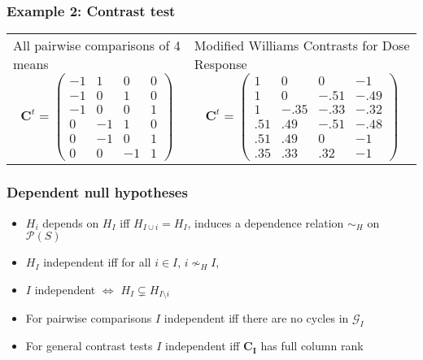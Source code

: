 \documentclass[bigger]{beamer}
\newcommand{\bs}[1]{\bm{#1}}
\begin{document}
\begin{frame}
\frametitle{Example 2: Contrast test}


\begin{tabular}{ll}
  \begin{minipage}{.45\textwidth}
    All pairwise comparisons of 4 means 
    \begin{displaymath}
    \bs{C}^t = \left(
      \begin{array}{llll}
      -1 & 1 & 0 & 0 \\
      -1 & 0 & 1 & 0 \\
      -1 & 0 & 0 & 1 \\
      0 & -1 & 1 & 0 \\
      0 & -1 & 0 & 1 \\
      0 & 0 & -1 & 1 
    \end{array}
    \right)
    \end{displaymath}
  \end{minipage} &
  \begin{minipage}{.55\textwidth}
    Modified Williams Contrasts for Dose Response
    \begin{displaymath}
      \bs{C}^t=\left(
      \begin{array}{llll}
        1 & 0 & 0 & -1\\
        1 & 0 &-.51 & -.49 \\
        1 & -.35 & -.33 & -.32\\
        .51 & .49 & -.51 & -.48\\
        .51 & .49 & 0 &  -1\\
        .35 & .33 & .32& -1
      \end{array}\right)
    \end{displaymath}
  \end{minipage}
\end{tabular}

\end{frame}



\begin{frame}
\frametitle{Dependent null hypotheses}

\begin{itemize}
\item $H_i$ depends on $H_I$ iff $H_{I \cup i} = H_{I}$, induces a
  dependence relation $\sim_H$ on $\mathcal{P}(S)$
\item $H_I$ independent iff for all $i \in I$, $i \nsim_H I$,
\item $I$ independent $\Leftrightarrow$ $H_{I} \subsetneq  H_{I\setminus i}$
\item For pairwise comparisons $I$ independent iff there are no cycles in $\mathscr{G}_I$
\item For general contrast tests $I$ independent iff $\bs{C_I}$ has full
  column rank
\end{itemize} %
\end{frame}
\end{document}
